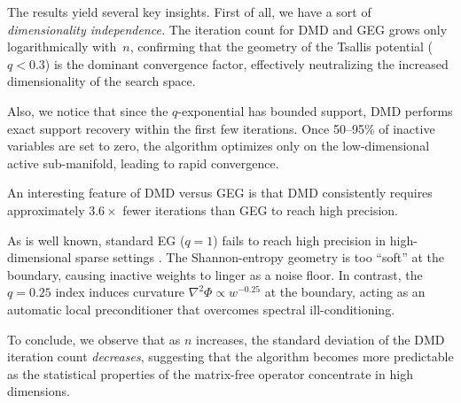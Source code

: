 \documentclass[10pt]{amsart}
\theoremstyle{definition}
\theoremstyle{definition}	 %
\begin{document}
The results yield several key insights. First of all, we have a sort of \textit{dimensionality independence.} The iteration count for DMD and GEG grows only logarithmically with~$n$, confirming that the geometry of the Tsallis potential ($q<0.3$) is the dominant convergence factor, effectively neutralizing the increased dimensionality of the search space. %

  
  
  
Also, we notice that since the $q$-exponential has bounded support, DMD performs exact support recovery within the first few iterations.  Once 50--95\% of inactive variables are set to zero, the algorithm optimizes only on the low-dimensional active sub-manifold, leading to rapid convergence.


  
   An interesting feature of DMD versus GEG is that    DMD consistently requires approximately $3.6\times$ fewer iterations than GEG to reach high precision.  
   

  
  
       
       
     As is well known, standard EG ($q=1$) fails to reach high precision in  high-dimensional sparse settings \cite{EG,MD1}.  The Shannon-entropy  geometry is too ``soft'' at the boundary, causing inactive  weights to linger as a noise floor.  In contrast, the  $q=0.25$ index induces curvature  $\nabla^2\Phi\propto w^{-0.25}$ at the boundary, acting as an automatic local preconditioner that overcomes spectral ill-conditioning.

  
  
 
 To conclude, we observe that as $n$ increases, the standard deviation of the DMD iteration count \emph{decreases}, suggesting that the algorithm becomes more predictable as the statistical properties of the matrix-free operator concentrate in high dimensions.
\end{document}
